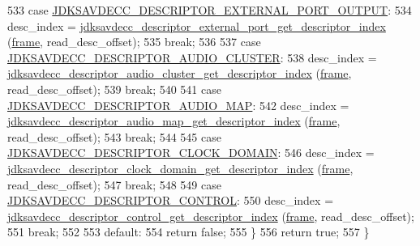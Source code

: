 \begin{DoxyCode}
533     \textcolor{keywordflow}{case} \hyperlink{group__descriptor_ga4a49e95850c4a63f051a9fe9aebde7e8}{JDKSAVDECC\_DESCRIPTOR\_EXTERNAL\_PORT\_OUTPUT}:
534         desc\_index = \hyperlink{group__descriptor__external__port_gabd5e434d744933866d1f5683a6d8bd42}{jdksavdecc\_descriptor\_external\_port\_get\_descriptor\_index}
      (\hyperlink{gst__avb__playbin_8c_ac8e710e0b5e994c0545d75d69868c6f0}{frame}, read\_desc\_offset);
535         \textcolor{keywordflow}{break};
536 
537     \textcolor{keywordflow}{case} \hyperlink{group__descriptor_ga3ed17cacf96ccf5d857a20c71d02f426}{JDKSAVDECC\_DESCRIPTOR\_AUDIO\_CLUSTER}:
538         desc\_index = \hyperlink{group__descriptor__audio__cluster_gac54877ae34c9b9eadb80dd19e0ee1d57}{jdksavdecc\_descriptor\_audio\_cluster\_get\_descriptor\_index}
      (\hyperlink{gst__avb__playbin_8c_ac8e710e0b5e994c0545d75d69868c6f0}{frame}, read\_desc\_offset);
539         \textcolor{keywordflow}{break};
540 
541     \textcolor{keywordflow}{case} \hyperlink{group__descriptor_ga8b923dc5b431ec457fc26e0dcfa88104}{JDKSAVDECC\_DESCRIPTOR\_AUDIO\_MAP}:
542         desc\_index = \hyperlink{group__descriptor__audio__map_ga9077f7e1cdcabda7ff66624904e2464d}{jdksavdecc\_descriptor\_audio\_map\_get\_descriptor\_index}
      (\hyperlink{gst__avb__playbin_8c_ac8e710e0b5e994c0545d75d69868c6f0}{frame}, read\_desc\_offset);
543         \textcolor{keywordflow}{break};
544 
545     \textcolor{keywordflow}{case} \hyperlink{group__descriptor_ga589df1006298ffeb54b5c7e5a831b062}{JDKSAVDECC\_DESCRIPTOR\_CLOCK\_DOMAIN}:
546         desc\_index = \hyperlink{group__descriptor__clock__domain_ga8de4e3c350af50630aa21b69890ea87e}{jdksavdecc\_descriptor\_clock\_domain\_get\_descriptor\_index}
      (\hyperlink{gst__avb__playbin_8c_ac8e710e0b5e994c0545d75d69868c6f0}{frame}, read\_desc\_offset);
547         \textcolor{keywordflow}{break};
548 
549     \textcolor{keywordflow}{case} \hyperlink{group__descriptor_gaafb6bdc564bbe2b62cb6f91bdb8185a8}{JDKSAVDECC\_DESCRIPTOR\_CONTROL}:
550         desc\_index = \hyperlink{group__descriptor__control_ga4e472a9d308d354e324cdb8678504b1d}{jdksavdecc\_descriptor\_control\_get\_descriptor\_index}
      (\hyperlink{gst__avb__playbin_8c_ac8e710e0b5e994c0545d75d69868c6f0}{frame}, read\_desc\_offset);
551         \textcolor{keywordflow}{break};
552 
553     \textcolor{keywordflow}{default}:
554         \textcolor{keywordflow}{return} \textcolor{keyword}{false};
555     \}
556     \textcolor{keywordflow}{return} \textcolor{keyword}{true};
557 \}
\end{DoxyCode}


